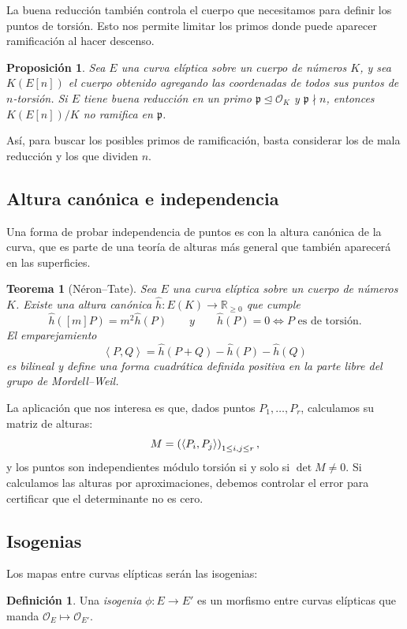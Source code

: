 \documentclass[a4paper]{book}
\theoremstyle{definition}
\newtheorem*{definition*}{Definición}
\theoremstyle{plain}
\newtheorem*{theorem*}{Teorema}
\newtheorem*{prop*}{Proposición}
\newcommand{\RR}{\mathbb{R}}
\newcommand{\OO}{\mathcal{O}}
\newcommand{\pp}{\mathfrak{p}}
\newcommand{\lp}{\left\lparen}
\newcommand{\rp}{\right\rparen}
\newcommand{\lc}{\left<}
\newcommand{\rc}{\right>}
\begin{document}
La buena reducción también controla el cuerpo que necesitamos para definir los puntos de torsión. Esto nos permite limitar los primos donde puede aparecer ramificación al hacer descenso.

\begin{prop*}
Sea $E$ una curva elíptica sobre un cuerpo de números $K$, y sea $K(E[n])$ el cuerpo obtenido agregando las coordenadas de todos sus puntos de $n$-torsión. Si $E$ tiene buena reducción en un primo $\pp\trianglelefteq\OO_K$ y $\pp\nmid n$, entonces $K(E[n])/K$ no ramifica en $\pp$.
\end{prop*}

Así, para buscar los posibles primos de ramificación, basta considerar los de mala reducción y los que dividen $n$.

\subsection{Altura canónica e independencia}

Una forma de probar independencia de puntos es con la altura canónica de la curva, que es parte de una teoría de alturas más general que también aparecerá en las superficies. 

\begin{theorem*}[Néron--Tate]
Sea $E$ una curva elíptica sobre un cuerpo de números $K$. Existe una altura canónica $\hat{h}:E(K)\to \RR_{\geq0}$ que cumple
\[
\hat{h}([m]P)=m^2\hat{h}(P)\qquad y \qquad
\hat{h}(P)=0\Longleftrightarrow P\text{ es de torsión}.
\]
El emparejamiento
\[
\lc P,Q \rc=\hat{h}(P+Q)-\hat{h}(P)-\hat{h}(Q)
\]
es bilineal y define una forma  cuadrática definida positiva en la parte libre del grupo de Mordell--Weil.
\end{theorem*}

La aplicación que nos interesa es que, dados puntos $P_1,\ldots,P_r$, calculamos su matriz de alturas:
\[
M=\lp \lc P_i,P_j \rc \rp_{1\leq i,j\leq r},
\]
y los puntos son independientes módulo torsión si y solo si $\det M\neq0$. Si calculamos las alturas por aproximaciones, debemos controlar el error para certificar que el determinante no es cero. 

\subsection{Isogenias}

Los mapas entre curvas elípticas serán las isogenias:

\begin{definition*}
Una \emph{isogenia} $\phi: E\to E'$ es un morfismo entre curvas elípticas que manda $\OO_E \mapsto \OO_{E'}$. 
\end{definition*}
\end{document}
